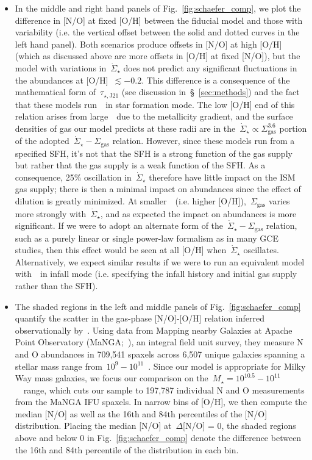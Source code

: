 \documentclass[ms.tex]{subfiles}
\begin{document}
\begin{itemize}
	\item In the middle and right hand panels of Fig.~\ref{fig:schaefer_comp}, 
	we plot the difference in [N/O] at fixed [O/H] between the fiducial model 
	and those with variability (i.e. the vertical offset between the solid and 
	dotted curves in the left hand panel). 
	Both scenarios produce offsets in [N/O] at high [O/H] (which as discussed 
	above are more offsets in [O/H] at fixed [N/O]), but the model with 
	variations in~$\dot{\Sigma}_\star$ does not predict any significant 
	fluctuations in the abundances at [O/H]~$\lesssim -0.2$. 
	This difference is a consequence of the mathematical form 
	of~$\tau_{\star,\text{J21}}$ (see discussion in~\S~\ref{sec:methods}) and 
	the fact that these models run~\vice~in star formation mode. 
	The low [O/H] end of this relation arises from large~\rgal~due to the 
	metallicity gradient, and the surface densities of gas our model predicts 
	at these radii are in 
	the~$\dot{\Sigma}_\star \propto \Sigma_\text{gas}^{3.6}$ portion of the 
	adopted~$\dot{\Sigma}_\star - \Sigma_\text{gas}$ relation. 
	However, since these models run from a specified SFH, it's not that the SFH 
	is a strong function of the gas supply but rather that the gas supply is a 
	weak function of the SFH. 
	As a consequence, 25\% oscillation in~$\dot{\Sigma}_\star$ therefore have 
	little impact on the ISM gas supply; there is then a minimal impact on 
	abundances since the effect of dilution is greatly minimized. 
	At smaller~\rgal~(i.e. higher [O/H]),~$\Sigma_\text{gas}$ varies more 
	strongly with~$\dot{\Sigma}_\star$, and as expected the impact on 
	abundances is more significant. 
	If we were to adopt an alternate form of 
	the~$\dot{\Sigma}_\star - \Sigma_\text{gas}$ relation, such as a purely 
	linear or single power-law formalism as in many GCE studies, then this 
	effect would be seen at all [O/H] when~$\dot{\Sigma}_\star$ oscillates. 
	Alternatively, we expect similar results if we were to run an equivalent 
	model with~\vice~in infall mode (i.e. specifying the infall history and 
	initial gas supply rather than the SFH). 

	\item The shaded regions in the left and middle panels of 
	Fig.~\ref{fig:schaefer_comp} quantify the scatter in the gas-phase 
	[N/O]-[O/H] relation inferred observationally by~\citet{Schaefer2020}. 
	Using data from Mapping nearby Galaxies at Apache Point Observatory 
	(MaNGA;~\citealp{Bundy2015}), an integral field unit survey, they measure 
	N and O abundances in 709,541 spaxels across 6,507 unique galaxies spanning 
	a stellar mass range from~$10^9 - 10^{11}$~\msun. 
	Since our model is appropriate for Milky Way mass galaxies, we focus our 
	comparison on the~$M_\star = 10^{10.5} - 10^{11}$~\msun~range, which cuts 
	our sample to 197,787 individual N and O measurements from the MaNGA IFU 
	spaxels. 
	In narrow bins of [O/H], we then compute the median [N/O] as well as the 
	16th and 84th percentiles of the [N/O] distribution. 
	Placing the median [N/O] at~$\Delta$[N/O] = 0, the shaded regions above and 
	below 0 in Fig.~\ref{fig:schaefer_comp} denote the difference between the 
	16th and 84th percentile of the distribution in each bin. 


\end{itemize}
\end{document}
